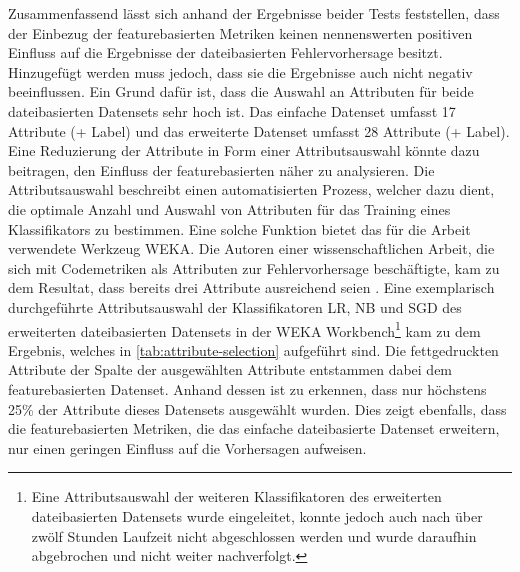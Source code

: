 Zusammenfassend lässt sich anhand der Ergebnisse beider Tests feststellen, dass der Einbezug der featurebasierten Metriken keinen nennenswerten positiven Einfluss auf die Ergebnisse der dateibasierten Fehlervorhersage besitzt. Hinzugefügt werden muss jedoch, dass sie die Ergebnisse auch nicht negativ beeinflussen. Ein Grund dafür ist, dass die Auswahl an Attributen für beide dateibasierten Datensets sehr hoch ist. Das \glqq einfache\grqq{} Datenset umfasst 17 Attribute (+ Label) und das erweiterte Datenset umfasst 28 Attribute (+ Label). Eine Reduzierung der Attribute in Form einer Attributsauswahl könnte dazu beitragen, den Einfluss der featurebasierten näher zu analysieren. Die Attributsauswahl beschreibt einen automatisierten Prozess, welcher dazu dient, die optimale Anzahl und Auswahl von Attributen für das Training eines Klassifikators zu bestimmen. Eine solche Funktion bietet das für die Arbeit verwendete Werkzeug WEKA. Die Autoren einer wissenschaftlichen Arbeit, die sich mit Codemetriken als Attributen zur Fehlervorhersage beschäftigte, kam zu dem Resultat, dass bereits drei Attribute ausreichend seien \cite{Wang2011}. Eine exemplarisch durchgeführte Attributsauswahl der Klassifikatoren LR, NB und SGD des erweiterten dateibasierten Datensets in der WEKA Workbench\footnote{Eine Attributsauswahl der weiteren Klassifikatoren des erweiterten dateibasierten Datensets wurde eingeleitet, konnte jedoch auch nach über zwölf Stunden Laufzeit nicht abgeschlossen werden und wurde daraufhin abgebrochen und nicht weiter nachverfolgt.} kam zu dem Ergebnis, welches in \autoref{tab:attribute-selection} aufgeführt sind. Die fettgedruckten Attribute der Spalte der ausgewählten Attribute entstammen dabei dem featurebasierten Datenset. Anhand dessen ist zu erkennen, dass nur höchstens 25\% der Attribute dieses Datensets ausgewählt wurden. Dies zeigt ebenfalls, dass die featurebasierten Metriken, die das \glqq einfache\grqq{} dateibasierte Datenset erweitern, nur einen geringen Einfluss auf die Vorhersagen aufweisen.


